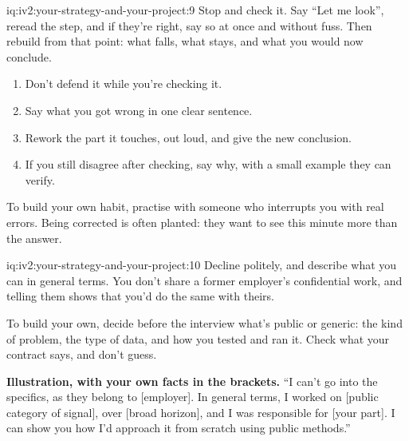 \begin{solution}{iq:iv2:your-strategy-and-your-project:9}
Stop and check it. Say ``Let me look'', reread the step, and if they're right, say so at once and without fuss. Then rebuild from that point: what falls, what stays, and what you would now conclude.

\begin{enumerate}
\item Don't defend it while you're checking it.
\item Say what you got wrong in one clear sentence.
\item Rework the part it touches, out loud, and give the new conclusion.
\item If you still disagree after checking, say why, with a small example they can verify.
\end{enumerate}

To build your own habit, practise with someone who interrupts you with real errors. Being corrected is often planted: they want to see this minute more than the answer.

\end{solution}

\begin{solution}{iq:iv2:your-strategy-and-your-project:10}
Decline politely, and describe what you can in general terms. You don't share a former employer's confidential work, and telling them shows that you'd do the same with theirs.

To build your own, decide before the interview what's public or generic: the kind of problem, the type of data, and how you tested and ran it. Check what your contract says, and don't guess.

\textbf{Illustration, with your own facts in the brackets.} ``I can't go into the specifics, as they belong to [employer]. In general terms, I worked on [public category of signal], over [broad horizon], and I was responsible for [your part]. I can show you how I'd approach it from scratch using public methods.''

\end{solution}

